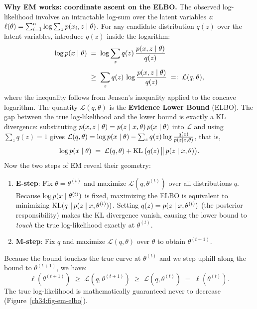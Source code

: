\begin{whybox}
\textbf{Why EM works: coordinate ascent on the ELBO.}
The observed log-likelihood involves an intractable log-sum over the latent variables $z$:
$\ell(\theta) = \sum_{i=1}^n \log \sum_{z} p(x_i, z \mid \theta)$.
For any candidate distribution $q(z)$ over the latent variables, introduce $q(z)$ inside the logarithm:
\begin{align*}
  \log p(x\mid\theta)
  &\;=\; \log \sum_z q(z)\,\frac{p(x,z\mid\theta)}{q(z)} \\[4pt]
  &\;\ge\; \sum_z q(z)\,\log\frac{p(x,z\mid\theta)}{q(z)} \;=:\; \mathcal{L}(q, \theta),
\end{align*}
where the inequality follows from Jensen's inequality applied to the concave logarithm.
The quantity $\mathcal{L}(q, \theta)$ is the \textbf{Evidence Lower Bound} (ELBO).
The gap between the true log-likelihood and the lower bound is exactly a KL divergence: substituting $p(x,z\mid\theta) = p(z\mid x,\theta)\,p(x\mid\theta)$ into $\mathcal{L}$ and using $\sum_z q(z) = 1$ gives $\mathcal{L}(q,\theta) = \log p(x\mid\theta) - \sum_z q(z)\log\frac{q(z)}{p(z\mid x,\theta)}$, that is,
\[
  \log p(x\mid\theta) \;=\; \mathcal{L}(q, \theta) + \operatorname{KL}\big(q(z) \,\big\|\, p(z\mid x,\theta)\big).
\]
Now the two steps of EM reveal their geometry:
\begin{enumerate}
  \item \textbf{E-step}: Fix $\theta = \theta^{(t)}$ and maximize $\mathcal{L}(q, \theta^{(t)})$ over all distributions $q$. Because $\log p(x\mid\theta^{(t)})$ is fixed, maximizing the ELBO is equivalent to minimizing $\operatorname{KL}(q \,\|\, p(z\mid x, \theta^{(t)}))$. Setting $q(z) = p(z\mid x, \theta^{(t)})$ (the posterior responsibility) makes the KL divergence vanish, causing the lower bound to \emph{touch} the true log-likelihood exactly at $\theta^{(t)}$.
  \item \textbf{M-step}: Fix $q$ and maximize $\mathcal{L}(q, \theta)$ over $\theta$ to obtain $\theta^{(t+1)}$.
\end{enumerate}
Because the bound touches the true curve at $\theta^{(t)}$ and we step uphill along the bound to $\theta^{(t+1)}$, we have:
\[
  \ell(\theta^{(t+1)}) \;\ge\; \mathcal{L}(q, \theta^{(t+1)}) \;\ge\; \mathcal{L}(q, \theta^{(t)}) \;=\; \ell(\theta^{(t)}).
\]
The true log-likelihood is mathematically guaranteed never to decrease (Figure~\ref{ch34:fig-em-elbo}).
\end{whybox}


